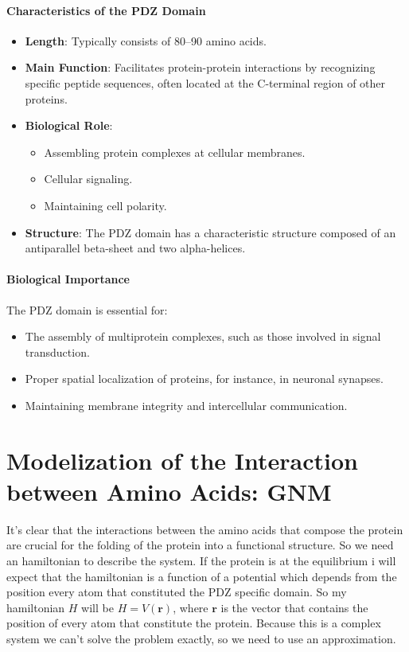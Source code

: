 \documentclass[English, Lau, oneside]{sapthesis}
\begin{document}
\subsubsection*{Characteristics of the PDZ Domain}
\begin{itemize}
    \item \textbf{Length}: Typically consists of 80--90 amino acids.
    \item \textbf{Main Function}: Facilitates protein-protein interactions by recognizing specific peptide sequences, often located at the C-terminal region of other proteins.
    \item \textbf{Biological Role}:
    \begin{itemize}
        \item Assembling protein complexes at cellular membranes.
        \item Cellular signaling.
        \item Maintaining cell polarity.
    \end{itemize}
    \item \textbf{Structure}: The PDZ domain has a characteristic structure composed of an antiparallel beta-sheet and two alpha-helices.
\end{itemize}

\subsubsection*{Biological Importance}
The PDZ domain is essential for:
\begin{itemize}
    \item The assembly of multiprotein complexes, such as those involved in signal transduction.
    \item Proper spatial localization of proteins, for instance, in neuronal synapses.
    \item Maintaining membrane integrity and intercellular communication.
\end{itemize}


\chapter{Modelization of the Interaction between Amino Acids: GNM}
It's clear that the interactions between the amino acids that compose the protein are crucial for the folding of the protein into a functional structure.
So we need an hamiltonian to describe the system.
If the protein is at the equilibrium i will expect that the hamiltonian is a function of a potential which depends from the position every atom that constituted the PDZ specific domain.
So my hamiltonian $H$ will be \( H = V(\mathbf{r}) \), where \( \mathbf{r} \) is the vector that contains the position of every atom that constitute the protein.
Because this is a complex system we can't solve the problem exactly, so we need to use an approximation.
\end{document}
